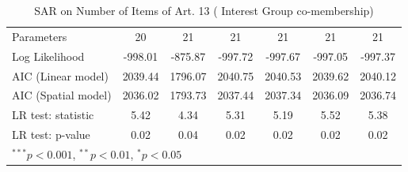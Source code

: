 \begin{table}[!h]
\begin{center}
\begin{tabular}{l c c c c c c }
Parameters              & 20           & 21           & 21           & 21           & 21           & 21           \\
Log Likelihood          & -998.01      & -875.87      & -997.72      & -997.67      & -997.05      & -997.37      \\
AIC (Linear model)      & 2039.44      & 1796.07      & 2040.75      & 2040.53      & 2039.62      & 2040.12      \\
AIC (Spatial model)     & 2036.02      & 1793.73      & 2037.44      & 2037.34      & 2036.09      & 2036.74      \\
LR test: statistic      & 5.42         & 4.34         & 5.31         & 5.19         & 5.52         & 5.38         \\
LR test: p-value        & 0.02         & 0.04         & 0.02         & 0.02         & 0.02         & 0.02         \\
\bottomrule
\multicolumn{7}{l}{\scriptsize{$^{***}p<0.001$, $^{**}p<0.01$, $^*p<0.05$}}
\end{tabular}
\caption{SAR on Number of Items of Art. 13 ( Interest Group co-membership)}
\label{table:coefficients}
\end{center}
\end{table}

